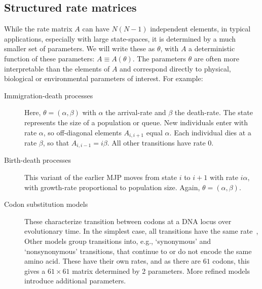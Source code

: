 \subsection{Structured rate matrices}
While the rate matrix $A$ can have $N(N-1)$ independent elements,
in typical applications, especially with large state-spaces, 
it is determined by a much smaller
set of parameters. We will write these as $\theta$, with
$A$ a deterministic function of these parameters: 
$A \equiv A(\theta)$. The parameters $\theta$ are often more 
interpretable than the elements of $A$ and correspond directly to
physical, biological or environmental parameters of interest. 
For example:
\begin{description}
  \item[Immigration-death processes] Here, $\theta = (\alpha,\beta)$
    with $\alpha$ the arrival-rate and $\beta$ the death-rate.
    The state represents the size of a 
    population or queue. New individuals
    enter with rate $\alpha$,
    so off-diagonal elements $A_{i,i+1}$ equal $\alpha$.
    Each individual dies %
    at a rate $\beta$, so that %
    $A_{i,i-1}=i\beta$.
    All other transitions have rate $0$. 
  \item[Birth-death processes] This variant of the
    earlier MJP moves from state $i$ 
    to $i+1$ with rate $i\alpha$, with growth-rate proportional to 
    population size. Again, 
    $\theta=(\alpha,\beta)$.
  \item[Codon substitution models] These %
    characterize transition between codons at a 
    DNA locus %
    over evolutionary time. In the simplest case,
    all transitions have the same rate~\cite{jukescantor69}, 
    Other models group transitions 
    into, e.g., `synonymous' and `nonsynonymous' transitions, 
    that continue to or do not encode the same amino acid. 
    These have their own rates, and as 
    there are $61$ codons, this gives a 
    $61\times 61$ matrix determined by 2 parameters. More refined 
    models~\cite{goldman1994codon} introduce additional parameters. 
\end{description}
